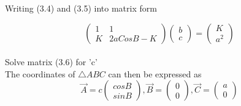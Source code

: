 \documentclass{beamer}
\theoremstyle{remark}
\numberwithin{equation}{section}
\begin{document}
\begin{frame}{}
    Writing (3.4) and (3.5) into matrix form

\begin{equation}
    \begin{pmatrix}
     1 &  1 \\
     K & 2aCosB - K
    \end{pmatrix}
    \begin{pmatrix}
     b \\
     c
    \end{pmatrix}
    =
    \begin{pmatrix}
     K \\
     a^2
    \end{pmatrix}
\end{equation} \\
\vspace{10pt}
Solve matrix (3.6) for 'c' \\
\vspace{10pt}
The coordinates of $\triangle ABC$ can then be expressed as
    \begin{equation}
        \Vec{A} = c
        \begin{pmatrix}
            cos B \\
            sin B
        \end{pmatrix},
        \Vec{B} =
        \begin{pmatrix}
            0 \\
            0
        \end{pmatrix},
        \Vec{C} = 
        \begin{pmatrix}
            a \\
            0
        \end{pmatrix}
    \end{equation}
    
\end{frame}
\end{document}
